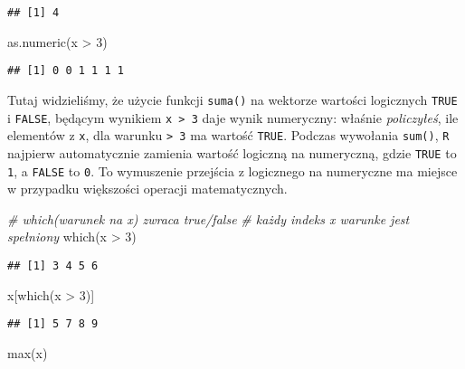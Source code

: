 \documentclass[
]{article}
\newenvironment{Shaded}{\begin{snugshade}}{\end{snugshade}}
\newcommand{\CommentTok}[1]{\textcolor[rgb]{0.56,0.35,0.01}{\textit{#1}}}
\newcommand{\DecValTok}[1]{\textcolor[rgb]{0.00,0.00,0.81}{#1}}
\newcommand{\FunctionTok}[1]{\textcolor[rgb]{0.00,0.00,0.00}{#1}}
\newcommand{\NormalTok}[1]{#1}
\newcommand{\SpecialCharTok}[1]{\textcolor[rgb]{0.00,0.00,0.00}{#1}}
\begin{document}
\begin{verbatim}
## [1] 4
\end{verbatim}

\begin{Shaded}
\begin{Highlighting}[]
\FunctionTok{as.numeric}\NormalTok{(x }\SpecialCharTok{\textgreater{}} \DecValTok{3}\NormalTok{)}
\end{Highlighting}
\end{Shaded}

\begin{verbatim}
## [1] 0 0 1 1 1 1
\end{verbatim}

Tutaj widzieliśmy, że użycie funkcji \texttt{suma()} na wektorze
wartości logicznych \texttt{TRUE} i \texttt{FALSE}, będącym wynikiem
\texttt{x\ \textgreater{}\ 3} daje wynik numeryczny: właśnie
\emph{policzyłeś}, ile elementów z \texttt{x}, dla warunku
\texttt{\textgreater{}\ 3} ma wartość \texttt{TRUE}. Podczas wywołania
\texttt{sum()}, \texttt{R} najpierw automatycznie zamienia wartość
logiczną na numeryczną, gdzie \texttt{TRUE} to \texttt{1}, a
\texttt{FALSE} to \texttt{0}. To wymuszenie przejścia z logicznego na
numeryczne ma miejsce w przypadku większości operacji matematycznych.

\begin{Shaded}
\begin{Highlighting}[]
\CommentTok{\# which(warunek na x) zwraca true/false  }
\CommentTok{\# każdy indeks x warunke jest spełniony}
\FunctionTok{which}\NormalTok{(x }\SpecialCharTok{\textgreater{}} \DecValTok{3}\NormalTok{)}
\end{Highlighting}
\end{Shaded}

\begin{verbatim}
## [1] 3 4 5 6
\end{verbatim}

\begin{Shaded}
\begin{Highlighting}[]
\NormalTok{x[}\FunctionTok{which}\NormalTok{(x }\SpecialCharTok{\textgreater{}} \DecValTok{3}\NormalTok{)]}
\end{Highlighting}
\end{Shaded}

\begin{verbatim}
## [1] 5 7 8 9
\end{verbatim}

\begin{Shaded}
\begin{Highlighting}[]
\FunctionTok{max}\NormalTok{(x)}
\end{Highlighting}
\end{Shaded}
\end{document}
